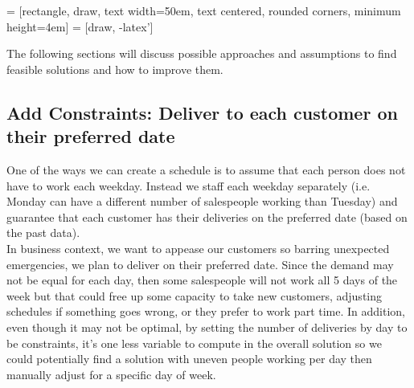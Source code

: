 \documentclass{article}
\begin{document}
 = [rectangle, draw, 
text width=50em, text centered, rounded corners, minimum height=4em]
 = [draw, -latex']


The following sections will discuss possible approaches and assumptions to find feasible solutions and how to improve them.

\subsection{Add Constraints: Deliver to each customer on their preferred date}
One of the ways we can create a schedule is to assume that each person does not have to work each weekday.  Instead we staff each weekday separately (i.e. Monday can have a different number of salespeople working than Tuesday) and guarantee that each customer has their deliveries on the preferred date (based on the past data).\\  

In business context, we want to appease our customers so barring unexpected emergencies, we plan to deliver on their preferred date.  Since the demand may not be equal for each day, then some salespeople will not work all 5 days of the week but that could free up some capacity to take new customers, adjusting schedules if something goes wrong, or they prefer to work part time.  In addition, even though it may not be optimal, by setting the number of deliveries by day to be constraints, it's one less variable to compute in the overall solution so we could potentially find a solution with uneven people working per day then manually adjust for a specific day of week.\\
\end{document}
